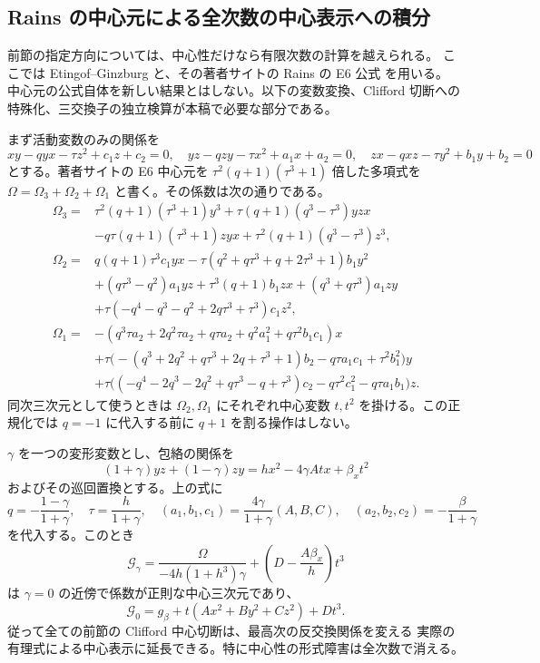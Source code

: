 \subsection{Rains の中心元による全次数の中心表示への積分}
\label{subsec:clifford-central-integration}
前節の指定方向については、中心性だけなら有限次数の計算を越えられる。
ここでは Etingof--Ginzburg \cite[Theorem 3.3.2, Appendix 9.1]{EGdelpezzo}
と、その著者サイトの Rains の E6 公式 \cite{RainsE6formula} を用いる。
中心元の公式自体を新しい結果とはしない。以下の変数変換、Clifford 切断への
特殊化、三交換子の独立検算が本稿で必要な部分である。

まず活動変数のみの関係を
\[
 xy-qyx-\tau z^2+c_1z+c_2=0,\quad
 yz-qzy-\tau x^2+a_1x+a_2=0,\quad
 zx-qxz-\tau y^2+b_1y+b_2=0
\]
とする。著者サイトの E6 中心元を
$\tau^2(q+1)(\tau^3+1)$ 倍した多項式を $\Omega=\Omega_3+\Omega_2+\Omega_1$
と書く。その係数は次の通りである。
\begin{align*}
\Omega_3={}&\tau^2(q+1)(\tau^3+1)y^3
 +\tau(q+1)(q^3-\tau^3)yzx\\
 &-q\tau(q+1)(\tau^3+1)zyx
 +\tau^2(q+1)(q^3-\tau^3)z^3,\\
\Omega_2={}&q(q+1)\tau^3c_1yx
 -\tau(q^2+q\tau^3+q+2\tau^3+1)b_1y^2\\
 &+(q\tau^3-q^2)a_1yz+\tau^3(q+1)b_1zx
 +(q^3+q\tau^3)a_1zy\\
 &+\tau(-q^4-q^3-q^2+2q\tau^3+\tau^3)c_1z^2,\\
\Omega_1={}&-(q^3\tau a_2+2q^2\tau a_2+q\tau a_2
             +q^2a_1^2+q\tau^2b_1c_1)x\\
 &+\tau\bigl(-(q^3+2q^2+q\tau^3+2q+\tau^3+1)b_2
             -q\tau a_1c_1+\tau^2b_1^2\bigr)y\\
 &+\tau\bigl((-q^4-2q^3-2q^2+q\tau^3-q+\tau^3)c_2
             -q\tau^2c_1^2-q\tau a_1b_1\bigr)z.
\end{align*}
同次三次元として使うときは $\Omega_2,\Omega_1$ にそれぞれ中心変数
$t,t^2$ を掛ける。この正規化では $q=-1$ に代入する前に
$q+1$ を割る操作はしない。

\begin{proposition}
\label{prop:clifford-central-integration}
$\gamma$ を一つの変形変数とし、包絡の関係を
\begin{equation}\label{eq:clifford-integrated-envelope}
 (1+\gamma)yz+(1-\gamma)zy
 =hx^2-4\gamma A tx+\beta_x t^2
\end{equation}
およびその巡回置換とする。上の式に
\[
 q=-\frac{1-\gamma}{1+\gamma},\quad
 \tau=\frac h{1+\gamma},\quad
 (a_1,b_1,c_1)=\frac{4\gamma}{1+\gamma}(A,B,C),\quad
 (a_2,b_2,c_2)=-\frac{\beta}{1+\gamma}
\]
を代入する。このとき
\begin{equation}\label{eq:clifford-integrated-cut}
 \mathcal G_\gamma
 =\frac{\Omega}{-4h(1+h^3)\gamma}
   +\left(D-\frac{A\beta_x}{h}\right)t^3
\end{equation}
は $\gamma=0$ の近傍で係数が正則な中心三次元であり、
\[
 \mathcal G_0=g_\beta+t(Ax^2+By^2+Cz^2)+Dt^3.
\]
従って全ての前節の Clifford 中心切断は、最高次の反交換関係を変える
実際の有理式による中心表示に延長できる。特に中心性の形式障害は全次数で消える。
\end{proposition}

